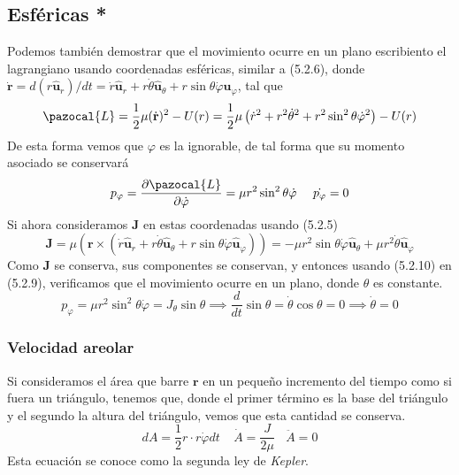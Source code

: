\subsection{Esféricas *}
Podemos también demostrar que el movimiento ocurre en un plano escribiento el lagrangiano usando coordenadas esféricas, similar a (5.2.6), donde $\dot{\mathbf{r}}=d{(r \hat{\mathbf{u}}_r)}/dt=\dot{r}\hat{\mathbf{u}}_r + r \dot{\theta }\hat{\mathbf{u}}_\theta + r\sin \theta \dot{\varphi} \hat{\mathbf{u}}_\varphi$, tal que 
\begin{equation} \label{5.1.17}
    \pazocal{L} = \frac{1}{2}\mu(\dot{\mathbf{r}})^2-U(r) = \frac{1}{2}\mu\left(\dot{r}^2+r^2\dot{\theta}^2 + r^2 \sin^2 \theta \dot{\varphi}^2\right)-U(r)
\end{equation} 
De esta forma vemos que $\varphi$ es la ignorable, de tal forma que su momento asociado se conservará
\begin{equation} \label{5.1.18}
    p_\varphi = \frac{\partial \pazocal{L}}{\partial \dot{\varphi}} = \mu r^2 \sin^2 \theta \dot{\varphi} \ \ \ \  \dot{p_\varphi} = 0
\end{equation} 
Si ahora consideramos $\mathbf{J}$ en estas coordenadas usando (5.2.5)
\begin{equation} \label{5.1.19}
    \mathbf{J} = \mu (\mathbf{r} \times (\dot{r}\hat{\mathbf{u}}_r + r \dot{\theta}\hat{\mathbf{u}}_\theta + r\sin \theta \dot{\varphi} \hat{\mathbf{u}}_\varphi))=-\mu r^2 \sin \theta \dot{\varphi} \hat{\mathbf{u}}_\theta + \mu r^2 \dot{\theta}\hat{\mathbf{u}}_\varphi
\end{equation} 
Como $\mathbf{J}$ se conserva, sus componentes se conservan, y entonces usando (5.2.10) en (5.2.9), verificamos que el movimiento ocurre en un plano, donde $\theta$ es constante.
\begin{equation} \label{5.1.20}
    p_\varphi = \mu r^2 \sin^2 \theta \dot{\varphi} = J_\theta \sin\theta \implies \frac{d}{dt} \sin\theta = \dot{\theta} \cos \theta = 0 \implies \dot{\theta} = 0
\end{equation} 
\vspace{-30pt}
\subsubsection{Velocidad areolar}
Si consideramos el área que barre $\mathbf{r}$ en un pequeño incremento del tiempo como si fuera un triángulo, tenemos que, donde el primer término es la base del triángulo y el segundo la altura del triángulo, vemos que esta cantidad se conserva.
\begin{equation} \label{5.1.21}
    dA = \frac{1}{2} r\cdot r\dot{\varphi} dt \ \ \ \ \ \dot{A} = \frac{J}{2\mu} \ \ \ \ \ddot{A} = 0
\end{equation} 
Esta ecuación se conoce como la segunda ley de \textit{Kepler}.
